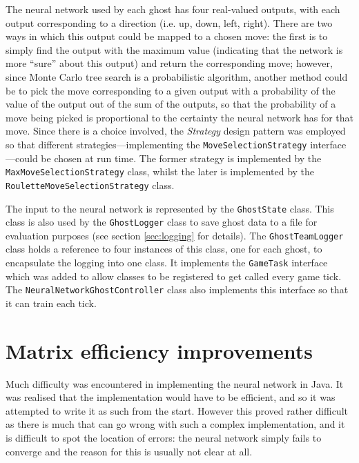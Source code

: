 The neural network used by each ghost has four real-valued outputs, with each output corresponding to a direction (i.e. up, down, left, right).  There are two ways in which this output could be mapped to a chosen move: the first is to simply find the output with the maximum value (indicating that the network is more ``sure'' about this output) and return the corresponding move; however, since Monte Carlo tree search is a probabilistic algorithm, another method could be to pick the move corresponding to a given output with a probability of the value of the output out of the sum of the outputs, so that the probability of a move being picked is proportional to the certainty the neural network has for that move.  Since there is a choice involved, the \emph{Strategy} design pattern was employed so that different strategies---implementing the {\tt MoveSelectionStrategy} interface---could be chosen at run time.  The former strategy is implemented by the {\tt MaxMoveSelectionStrategy} class, whilst the later is implemented by the {\tt RouletteMoveSelectionStrategy} class.

The input to the neural network is represented by the {\tt GhostState} class.  This class is also used by the {\tt GhostLogger} class to save ghost data to a file for evaluation purposes (see section \ref{sec:logging} for details).  The {\tt GhostTeamLogger} class holds a reference to four instances of this class, one for each ghost, to encapsulate the logging into one class.  It implements the {\tt GameTask} interface which was added to allow classes to be registered to get called every game tick.  The {\tt NeuralNetworkGhostController} class also implements this interface so that it can train each tick.

\section{Matrix efficiency improvements}
\label{sec:efficiency}

Much difficulty was encountered in implementing the neural network in Java.  It was realised that the implementation would have to be efficient, and so it was attempted to write it as such from the start.  However this proved rather difficult as there is much that can go wrong with such a complex implementation, and it is difficult to spot the location of errors: the neural network simply fails to converge and the reason for this is usually not clear at all.

